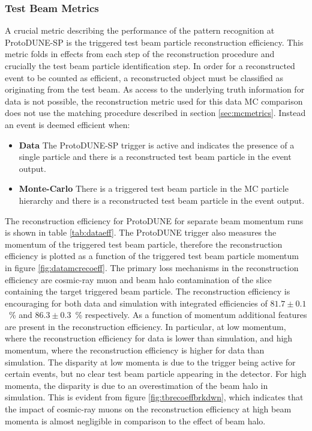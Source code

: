 \subsubsection{Test Beam Metrics}
A crucial metric describing the performance of the pattern recognition at ProtoDUNE-SP is the triggered test beam particle reconstruction efficiency.  This metric folds in effects from each step of the reconstruction procedure and crucially the test beam particle identification step.  In order for a reconstructed event to be counted as efficient, a reconstructed object must be classified as originating from the test beam.  As access to the underlying truth information for data is not possible, the reconstruction metric used for this data MC comparison does not use the matching procedure described in section \ref{sec:mcmetrics}.  Instead an event is deemed efficient when:

\begin{itemize}
\item \textbf{Data} The ProtoDUNE-SP trigger is active and indicates the presence of a single particle and there is a reconstructed test beam particle in the event output.
\item \textbf{Monte-Carlo} There is a triggered test beam particle in the MC particle hierarchy and there is a reconstructed test beam particle in the event output.
\end{itemize}

The reconstruction efficiency for ProtoDUNE for separate beam momentum runs is shown in table \ref{tab:dataeff}.  The ProtoDUNE trigger also measures the momentum of the triggered test beam particle, therefore the reconstruction efficiency is plotted as a function of the triggered test beam particle momentum in figure \ref{fig:datamcrecoeff}.  The primary loss mechanisms in the reconstruction efficiency are cosmic-ray muon and beam halo contamination of the slice containing the target triggered beam particle.  The reconstruction efficiency is encouraging for both data and simulation with integrated efficiencies of $81.7 \pm 0.1$~\% and $86.3 \pm 0.3$~\% respectively.  As a function of momentum additional features are present in the reconstruction efficiency.  In particular, at low momentum, where the reconstruction efficiency for data is lower than simulation, and high momentum, where the reconstruction efficiency is higher for data than simulation.  The disparity at low momenta is due to the trigger being active for certain events, but no clear test beam particle appearing in the detector.   For high momenta, the disparity is due to an overestimation of the beam halo in simulation.  This is evident from figure \ref{fig:tbrecoeffbrkdwn}, which indicates that the impact of cosmic-ray muons on the reconstruction efficiency at high beam momenta is almost negligible in comparison to the effect of beam halo.

